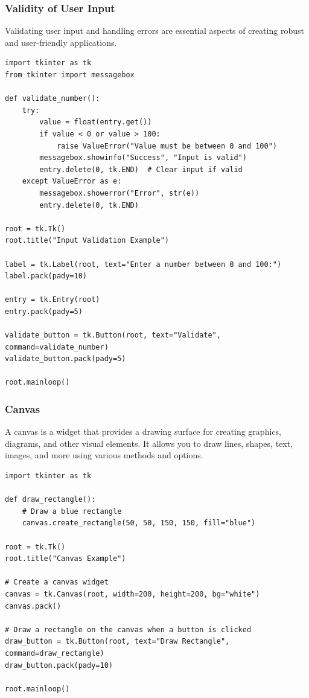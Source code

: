 \subsubsection{Validity of User Input}
Validating user input and handling errors are essential aspects of creating robust and user-friendly applications. 
\begin{codebox}
\begin{verbatim}
import tkinter as tk
from tkinter import messagebox

def validate_number():
    try:
        value = float(entry.get())
        if value < 0 or value > 100:
            raise ValueError("Value must be between 0 and 100")
        messagebox.showinfo("Success", "Input is valid")
        entry.delete(0, tk.END)  # Clear input if valid
    except ValueError as e:
        messagebox.showerror("Error", str(e))
        entry.delete(0, tk.END)

root = tk.Tk()
root.title("Input Validation Example")

label = tk.Label(root, text="Enter a number between 0 and 100:")
label.pack(pady=10)

entry = tk.Entry(root)
entry.pack(pady=5)

validate_button = tk.Button(root, text="Validate", command=validate_number)
validate_button.pack(pady=5)

root.mainloop()
\end{verbatim}
\end{codebox}

\newpage
\subsubsection{Canvas}
A canvas is a widget that provides a drawing surface for creating graphics, diagrams, and other visual elements. It allows you to draw lines, shapes, text, images, and more using various methods and options.

\begin{codebox}
\begin{verbatim}
import tkinter as tk

def draw_rectangle():
	# Draw a blue rectangle
    canvas.create_rectangle(50, 50, 150, 150, fill="blue")  

root = tk.Tk()
root.title("Canvas Example")

# Create a canvas widget
canvas = tk.Canvas(root, width=200, height=200, bg="white")
canvas.pack()

# Draw a rectangle on the canvas when a button is clicked
draw_button = tk.Button(root, text="Draw Rectangle", command=draw_rectangle)
draw_button.pack(pady=10)

root.mainloop()
\end{verbatim}
\end{codebox}


